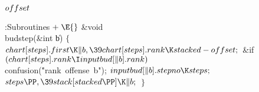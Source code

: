 \B\D$\\{offset}$ \5
\par
\Y\B\4:Subroutines\X${}\mathrel+\E{}$\6
\&{void} \\{budstep}(\&{int} \|b)\1\1\2\2\6
${}\{{}$\1\6
${}\\{chart}[\\{steps}].\\{first}\K\|b,\39\\{chart}[\\{steps}].\\{rank}\K%
\\{stacked}-\\{offset};{}$\6
\&{if} ${}(\\{chart}[\\{steps}].\\{rank}\I\\{inputbud}[\|b].\\{rank}){}$\1\5
\\{confusion}(\.{"rank\ offense\ b"});\2\6
${}\\{inputbud}[\|b].\\{stepno}\K\\{steps};{}$\6
${}\\{steps}\PP,\39\\{stack}[\\{stacked}\PP]\K\|b;{}$\6
\4${}\}{}$\2\par
\fi

